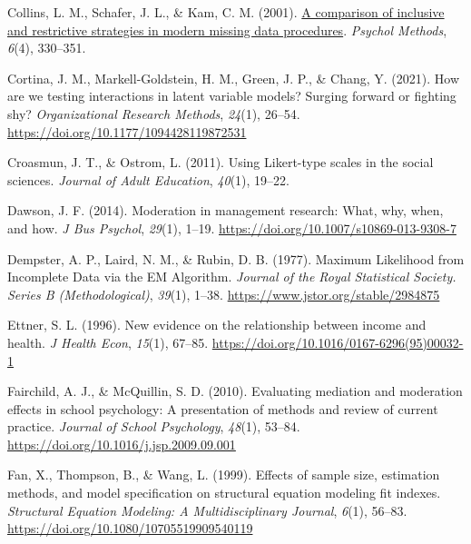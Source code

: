 \documentclass[
  11pt,
  man]{apa6}
\newlength{\cslhangindent}
\newlength{\cslentryspacingunit} %
\newenvironment{CSLReferences}[2] %
 {%
  \setlength{\parindent}{0pt}
  \ifodd #1
  \let\oldpar\par
  \def\par{\hangindent=\cslhangindent\oldpar}
  \fi
  \setlength{\parskip}{#2\cslentryspacingunit}
 }%
 {}
\begin{document}
\begin{CSLReferences}{1}{0}
\leavevmode{}%
Collins, L. M., Schafer, J. L., \& Kam, C. M. (2001). \href{https://www.ncbi.nlm.nih.gov/pubmed/11778676}{A comparison of inclusive and restrictive strategies in modern missing data procedures}. \emph{Psychol Methods}, \emph{6}(4), 330--351.

\leavevmode{}%
Cortina, J. M., Markell-Goldstein, H. M., Green, J. P., \& Chang, Y. (2021). How are we testing interactions in latent variable models? {Surging} forward or fighting shy? \emph{Organizational Research Methods}, \emph{24}(1), 26--54. \url{https://doi.org/10.1177/1094428119872531}

\leavevmode{}%
Croasmun, J. T., \& Ostrom, L. (2011). Using {Likert-type scales} in the {social sciences}. \emph{Journal of Adult Education}, \emph{40}(1), 19--22.

\leavevmode{}%
Dawson, J. F. (2014). Moderation in {management research}: {What}, {why}, {when}, and {how}. \emph{J Bus Psychol}, \emph{29}(1), 1--19. \url{https://doi.org/10.1007/s10869-013-9308-7}

\leavevmode{}%
Dempster, A. P., Laird, N. M., \& Rubin, D. B. (1977). Maximum {Likelihood} from {Incomplete Data} via the {EM Algorithm}. \emph{Journal of the Royal Statistical Society. Series B (Methodological)}, \emph{39}(1), 1--38. \url{https://www.jstor.org/stable/2984875}

\leavevmode{}%
Ettner, S. L. (1996). New evidence on the relationship between income and health. \emph{J Health Econ}, \emph{15}(1), 67--85. \url{https://doi.org/10.1016/0167-6296(95)00032-1}

\leavevmode{}%
Fairchild, A. J., \& McQuillin, S. D. (2010). Evaluating mediation and moderation effects in school psychology: {A} presentation of methods and review of current practice. \emph{Journal of School Psychology}, \emph{48}(1), 53--84. \url{https://doi.org/10.1016/j.jsp.2009.09.001}

\leavevmode{}%
Fan, X., Thompson, B., \& Wang, L. (1999). Effects of sample size, estimation methods, and model specification on structural equation modeling fit indexes. \emph{Structural Equation Modeling: A Multidisciplinary Journal}, \emph{6}(1), 56--83. \url{https://doi.org/10.1080/10705519909540119}


\end{CSLReferences}
\end{document}
